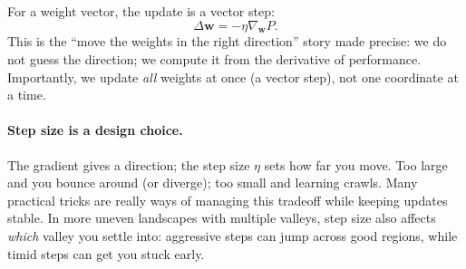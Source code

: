 For a weight vector, the update is a vector step:
\begin{equation}
\Delta \mathbf{w} = -\eta \nabla_{\mathbf{w}} P.
\label{eq:vectorized_update}
\end{equation}
This is the ``move the weights in the right direction'' story made precise: we do not guess the direction; we compute it from the derivative of performance. Importantly, we update \emph{all} weights at once (a vector step), not one coordinate at a time.

\paragraph{Step size is a design choice.}
The gradient gives a direction; the step size \(\eta\) sets how far you move. Too large and you bounce around (or diverge); too small and learning crawls. Many practical tricks are really ways of managing this tradeoff while keeping updates stable. In more uneven landscapes with multiple valleys, step size also affects \emph{which} valley you settle into: aggressive steps can jump across good regions, while timid steps can get you stuck early.

